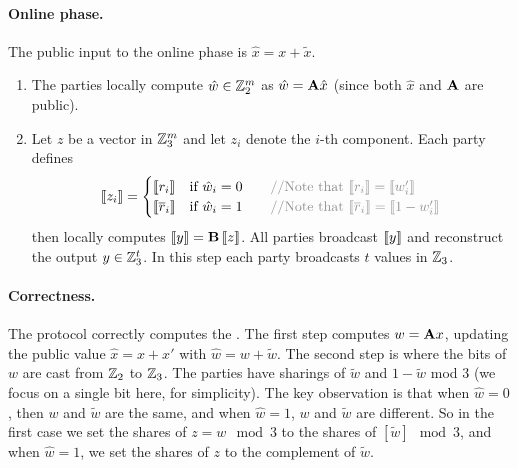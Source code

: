 \paragraph{Online phase.}
The public input to the online phase is $\hat{x} = x + \tilde{x}$. 
\begin{enumerate}

\item The parties locally compute $\hat{w} \in \mathbb{Z}_2^{m}$ as $\hat{w} = \mathbf{A}\hat{x}$ (since both $\hat{x}$ and $\mathbf{A}$ are public). 

\item Let $z$ be a vector in $\mathbb{Z}_3^m$ and let $z_i$ denote the $i$-th component. Each party defines 
\[
    \share{z_i}  = \begin{cases}
                \share{r_i}  & \text{if $\hat{w}_i = 0$} \algcomment{\text{Note that $\share{r_i} = \share{w_i'}$}}\\
                \share{\overline{r}_i}  & \text{if $\hat{w}_i = 1$} \algcomment{\text{Note that $\share{\overline{r}_i} = \share{1- w_i'}$}}\\
            \end{cases}
\]
then locally computes $\left\llbracket y \right\rrbracket = \mathbf{B}\left\llbracket z \right\rrbracket$. All parties broadcast $\left\llbracket y \right\rrbracket$ and reconstruct the output $y\in\mathbb{Z}_{3}^t$. 
In this step each party broadcasts $t$ values in $\mathbb{Z}_3$.
\end{enumerate}

\paragraph{Correctness.} The protocol correctly computes the \ttOWF.  The
first step computes $w = \mathbf{A} x$, 
updating the public value $\hat{x} = x + x'$ with $\hat{w} = w + \tilde{w}$.  The
second step is where the bits of $w$ are cast from $\mathbb{Z}_2$ to $\mathbb{Z}_3$.  The 
parties have sharings of $\tilde{w}$ and $1-\tilde{w}$ mod 3 (we focus on a single bit here, for simplicity). The key observation is
that when $\hat{w} = 0$, then $w$ and $\tilde{w}$ are the same, and when $\hat{w} =
1$, $w$ and $\tilde{w}$ are different. So in the first case we set the shares of $ z =
w \mod 3$ to the shares of $[\tilde{w}] \mod 3$, and when $\hat{w} = 1$, we set the
shares of $z$ to the complement of $\tilde{w}$.

